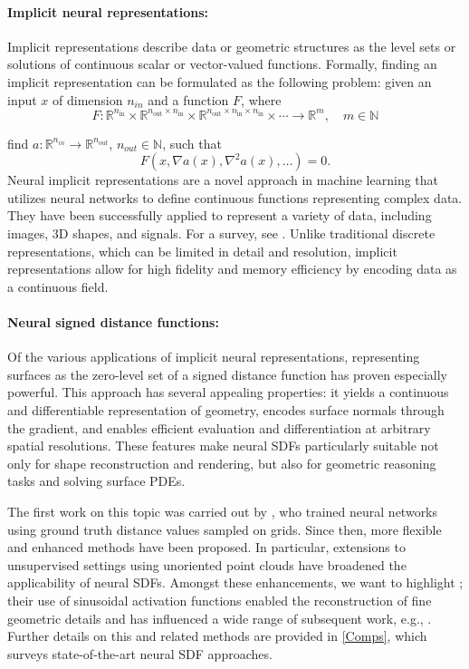 \documentclass[12pt,openany]{book}
\newcommand{\R}{\mathbb{R}}
\theoremstyle{plainnormal}
\theoremstyle{remark}
\begin{document}
\paragraph{Implicit neural representations:} 
Implicit representations describe data or geometric structures as the level sets or solutions of continuous scalar or vector-valued functions. Formally, finding an implicit representation can be formulated as the following problem: given an input $x$ of dimension $n_{in}$ and a function $F$, where
\[
F: \mathbb{R}^{n_{\text{in}}} \times \mathbb{R}^{n_{\text{out}} \times n_{\text{in}}} \times \mathbb{R}^{n_{\text{out}} \times n_{\text{in}} \times n_{\text{in}}} \times \cdots \rightarrow \mathbb{R}^m, \quad m \in \mathbb N
\]

find $a: \R^{n_{in}} \rightarrow \R^{n_{out}}$, $n_{{out}}\in \mathbb{N}$, such that $$F(x, \nabla a(x), \nabla^2a(x), \dots) = 0.$$ 
Neural implicit representations are a novel approach in machine learning that utilizes neural networks to define continuous functions representing complex data. They have been successfully applied to represent a variety of data, including images, 3D shapes, and signals. For a survey, see \cite{essakine2025standimplicitneuralrepresentations}. Unlike traditional discrete representations, which can be limited in detail and resolution, implicit representations allow for high fidelity and memory efficiency by encoding data as a continuous field.
  
\paragraph{Neural signed distance functions:}  
Of the various applications of implicit neural representations, representing surfaces as the zero-level set of a signed distance function has proven especially powerful.
This approach has several appealing properties: it yields a continuous and differentiable representation of geometry, encodes surface normals through the gradient, and enables efficient evaluation and differentiation at arbitrary spatial resolutions. These features make neural SDFs particularly suitable not only for shape reconstruction and rendering, but also for geometric reasoning tasks and solving surface PDEs.\par
The first work on this topic was carried out by \cite{park2019deepsdflearningcontinuoussigned}, who trained neural networks using ground truth distance values sampled on grids. Since then, more flexible and enhanced methods have been proposed. In particular, extensions to unsupervised settings using unoriented point clouds have broadened the applicability of neural SDFs. Amongst these enhancements, we want to highlight \cite{sitzmann2020implicitneuralrepresentationsperiodic}; their use of sinusoidal activation functions enabled the reconstruction of fine geometric details and has influenced a wide range of subsequent work, e.g., \cite{wang2023neuralsingularhessianimplicitneuralrepresentation}. Further details on this and related methods are provided in \cref{Comps}, which surveys state-of-the-art neural SDF approaches.
\end{document}
